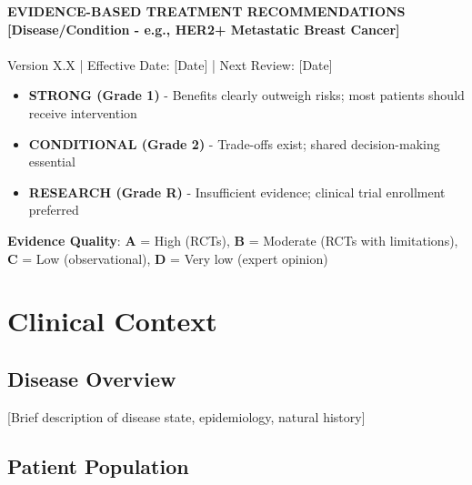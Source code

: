 \documentclass[10pt,letterpaper]{article}
\begin{document}
\begin{center}
{\fontsize{14}{16}\selectfont\bfseries\color{headerblue} EVIDENCE-BASED TREATMENT RECOMMENDATIONS}\\[2pt]
{\fontsize{12}{14}\selectfont\bfseries [Disease/Condition - e.g., HER2+ Metastatic Breast Cancer]}\\[2pt]
{\fontsize{10}{12}}\\[1pt]
{\fontsize{9}{11}\selectfont Version X.X | Effective Date: [Date] | Next Review: [Date]}
\end{center}

\vspace{4pt}

\begin{tcolorbox}[colback=highlightgray,colframe=black,title=\textbf{Recommendation Strength Key},fonttitle=\bfseries\small,coltitle=black]
{\small
\begin{itemize}
\item \colorbox{stronggreen!30}{\textbf{STRONG (Grade 1)}} - Benefits clearly outweigh risks; most patients should receive intervention
\item \colorbox{conditionalyellow!30}{\textbf{CONDITIONAL (Grade 2)}} - Trade-offs exist; shared decision-making essential
\item \colorbox{researchblue!30}{\textbf{RESEARCH (Grade R)}} - Insufficient evidence; clinical trial enrollment preferred
\end{itemize}

\textbf{Evidence Quality}: \textbf{A} = High (RCTs), \textbf{B} = Moderate (RCTs with limitations), \textbf{C} = Low (observational), \textbf{D} = Very low (expert opinion)
}
\end{tcolorbox}

\vspace{2pt}

\section{Clinical Context}

\subsection{Disease Overview}

[Brief description of disease state, epidemiology, natural history]

\subsection{Patient Population}
\end{document}
